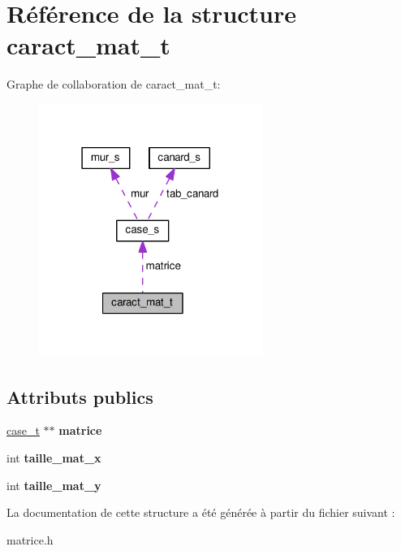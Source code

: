 \hypertarget{structcaract__mat__t}{}\section{Référence de la structure caract\+\_\+mat\+\_\+t}
\label{structcaract__mat__t}


Graphe de collaboration de caract\+\_\+mat\+\_\+t\+:\nopagebreak
\begin{figure}[H]
\begin{center}
\leavevmode
\includegraphics[width=207pt]{structcaract__mat__t__coll__graph}
\end{center}
\end{figure}
\subsection*{Attributs publics}
\begin{DoxyCompactItemize}
\item 
\hyperlink{structcase__s}{case\+\_\+t} $\ast$$\ast$ {\bfseries matrice}\hypertarget{structcaract__mat__t_aa3569a2f1b929270f199d67ba5e69e22}{}\label{structcaract__mat__t_aa3569a2f1b929270f199d67ba5e69e22}

\item 
int {\bfseries taille\+\_\+mat\+\_\+x}\hypertarget{structcaract__mat__t_a2cb8eefb38e1c69b0972af2757a56fbe}{}\label{structcaract__mat__t_a2cb8eefb38e1c69b0972af2757a56fbe}

\item 
int {\bfseries taille\+\_\+mat\+\_\+y}\hypertarget{structcaract__mat__t_a84ff012cb096bc4faf26947077ed8450}{}\label{structcaract__mat__t_a84ff012cb096bc4faf26947077ed8450}

\end{DoxyCompactItemize}


La documentation de cette structure a été générée à partir du fichier suivant \+:\begin{DoxyCompactItemize}
\item 
matrice.\+h\end{DoxyCompactItemize}
